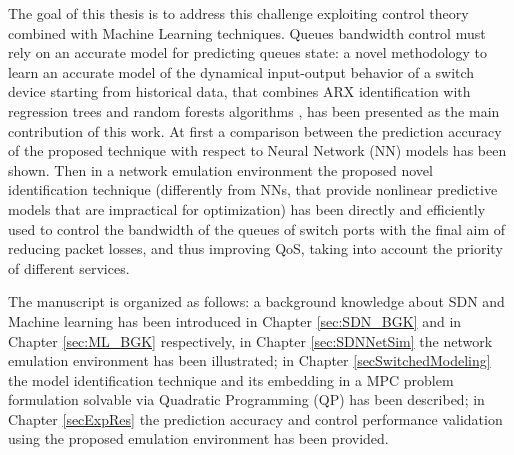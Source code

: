 The goal of this thesis is to address this challenge exploiting control theory combined with Machine Learning techniques. Queues bandwidth control must rely on an accurate model for predicting queues state:
a novel methodology to learn an accurate model of the dynamical input-output behavior of a switch device starting from historical data, that combines ARX identification with regression trees and random forests algorithms \cite{Carner2017, Jain2016, Pasquini2017}, has been presented as the main contribution of this work. At first a comparison between the prediction accuracy of the proposed technique with respect to Neural Network (NN) models has been shown. Then in a network emulation environment the proposed novel identification technique (differently from NNs, that provide nonlinear predictive models that are impractical for optimization) has been directly and efficiently used to control the bandwidth of the queues of switch ports with the final aim of reducing packet losses, and thus improving QoS, taking into account the priority of different services.

The manuscript is organized as follows: a background knowledge about SDN and Machine learning has been introduced in Chapter \ref{sec:SDN_BGK} and in Chapter \ref{sec:ML_BGK} respectively, in Chapter \ref{sec:SDNNetSim} the network emulation environment has been illustrated; in Chapter \ref{secSwitchedModeling} the model identification technique and its embedding in a MPC problem formulation solvable via Quadratic Programming (QP) has been described; in Chapter \ref{secExpRes} the prediction accuracy and control performance validation using the proposed emulation environment has been provided.